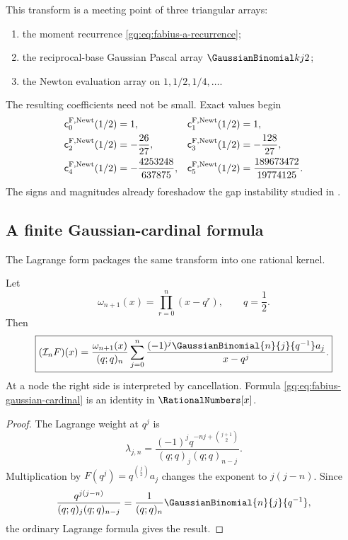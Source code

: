 This transform is a meeting point of three triangular arrays:
\begin{enumerate}
\item the moment recurrence \eqref{gq:eq:fabius-a-recurrence};
\item the reciprocal-base Gaussian Pascal array $\twobinom{k}{j}$;
\item the Newton evaluation array on $1,1/2,1/4,\ldots$.
\end{enumerate}
The resulting coefficients need not be small.  Exact values begin
\begin{align}
 \mathsf{c}^{\mathrm{F,Newt}}_{0}\!\left(1/2\right)&=1,
 &\mathsf{c}^{\mathrm{F,Newt}}_{1}\!\left(1/2\right)&=1,\notag\\
 \mathsf{c}^{\mathrm{F,Newt}}_{2}\!\left(1/2\right)&=-\frac{26}{27},
 &\mathsf{c}^{\mathrm{F,Newt}}_{3}\!\left(1/2\right)&=-\frac{128}{27},
 \label{gq:eq:first-fabius-newton-1}\\
 \mathsf{c}^{\mathrm{F,Newt}}_{4}\!\left(1/2\right)&=-\frac{4253248}{637875},
 &\mathsf{c}^{\mathrm{F,Newt}}_{5}\!\left(1/2\right)&=\frac{189673472}{19774125}.
 \label{gq:eq:first-fabius-newton-2}
\end{align}
The signs and magnitudes already foreshadow the gap instability studied in
.

\subsection{A finite Gaussian-cardinal formula}

The Lagrange form packages the same transform into one rational kernel.

\begin{theorem}
\label{gq:thm:fabius-gaussian-cardinal}
Let
\[
 \omega_{n+1}(x)=\prod_{r=0}^{n}(x-q^r),
 \qquad q=\frac12.
\]
Then
\begin{equation}
 \boxed{
 (\Interp_nF)(x)
 =\frac{\omega_{n+1}(x)}{(q;q)_n}
   \sum_{j=0}^{n}
   \frac{(-1)^j\GaussianBinomial{n}{j}{q^{-1}}a_j}{x-q^j}.}
 \label{gq:eq:fabius-gaussian-cardinal}
\end{equation}
At a node the right side is interpreted by cancellation.  Formula
\eqref{gq:eq:fabius-gaussian-cardinal} is an identity in $\RationalNumbers[x]$.
\end{theorem}

\begin{proof}
The Lagrange weight at $q^j$ is
\[
 \lambda_{j,n}
 =\frac{(-1)^jq^{-nj+\binom{j+1}{2}}}
 {(q;q)_j(q;q)_{n-j}}.
\]
Multiplication by $F(q^j)=q^{\binom j2}a_j$ changes the exponent to
$j(j-n)$.  Since
\[
 \frac{q^{j(j-n)}}{(q;q)_j(q;q)_{n-j}}
 =\frac1{(q;q)_n}\GaussianBinomial{n}{j}{q^{-1}},
\]
the ordinary Lagrange formula gives the result.
\end{proof}

